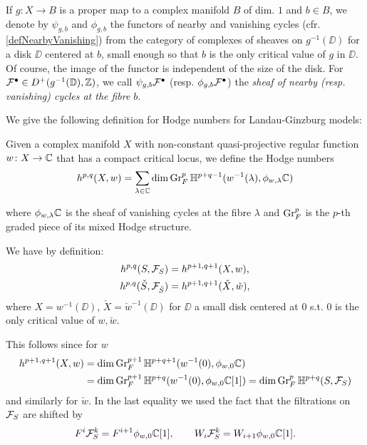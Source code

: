 \documentclass[../main.tex]{subfiles}
\begin{document}
If $g \colon X \to B$ is a proper map to a complex manifold $B$ of dim. $1$ and $b \in B$, we denote by $\psi_{g,b}$ and $\phi_{g,b}$ the functors of nearby and vanishing cycles (cfr. \ref{defNearbyVanishing}) from the category of complexes of sheaves on $g^{-1}(\DD)$ for a disk $\DD$ centered at $b$, small enough so that $b$ is the only critical value of $g$ in $\DD$. Of course, the image of the functor is independent of the size of the disk.
For $\mathcal{F}^\bullet \in D^+(g^{-1}(\mathbb{D}),\mathbb{Z})$, we call $\psi_{g,b} \mathcal{F}^\bullet$ (resp. $\phi_{g,b} \mathcal{F}^\bullet$) the \emph{sheaf of nearby (resp. vanishing) cycles at the fibre} $b$.


We give the following definition for Hodge numbers for Landau-Ginzburg models:
\begin{defn}
     Given a complex manifold $X$ with non-constant quasi-projective regular function $w \colon X \to \mathbb{C}$ that has a compact critical locus, we define the Hodge numbers
     \[
h^{p,q}(X, w) = \sum_{\lambda \in \mathbb{C}} \dim \operatorname{Gr}^p_F \mathbb{H}^{p+q-1}(w^{-1}(\lambda), \phi_{w,\lambda} \mathbb{C})
     \]

where $\phi_{w,\lambda}\mathbb{C}$ is the sheaf of vanishing cycles at the fibre $\lambda$ and $\operatorname{Gr}^p_F$ is the $p$-th graded piece of its mixed Hodge structure.
\end{defn}

We have by definition:
\begin{align*}    
h^{p,q}(S, \mathcal{F}_S) &= h^{p+1,q+1}(X, w), \\
h^{p,q}(\check{S}, \mathcal{F}_{\check{S}}) &= h^{p+1,q+1} ( \check{X} ,\check{w}),
\end{align*}
where $X = w^{-1}(\DD)$, $\check{X} = \check{w}^{-1}(\DD)$ for $\DD$ a small disk centered at $0$ s.t. $0$ is the only critical value of $w,\check{w}$.

This follows since for $w$ 
\begin{align*}
 h^{p+1,q+1}(X ,{w}) &= \dim \operatorname{Gr}^{p+1}_F \mathbb{H}^{p+q+1}(w^{-1}(0), \phi_{w,0} \mathbb{C}) \\
 &= \dim \operatorname{Gr}^{p+1}_F \mathbb{H}^{p+q}(w^{-1}(0), \phi_{w,0} \mathbb{C}[1]) = \dim \operatorname{Gr}^p_F \mathbb{H}^{p+q}(S, \mathcal{F}_S)
\end{align*}
and similarly for $\check{w}$. In the last equality we used the fact that the filtrations on $\mathcal{F}_S$ are shifted by
\begin{align*}
    F^i \mathcal{F}^k_S = F^{i+1} \phi_{w,0} \mathbb{C}[1], \quad \quad W_i \mathcal{F}^k_S = W_{i+1} \phi_{w,0} \mathbb{C}[1].
\end{align*}
\end{document}
